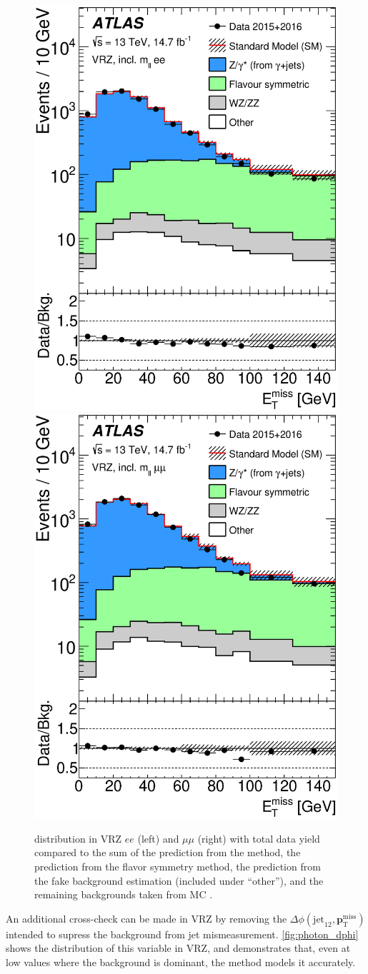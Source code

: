 \begin{centering}
\begin{figure}[!hbt]
\myfloatalign
\includegraphics[width=.45\linewidth]{figures/photons/MET_azmet_ee.eps}
\includegraphics[width=.45\linewidth]{figures/photons/MET_azmet_mm.eps}
\caption{\MET distribution in VRZ $ee$ (left) and $\mu\mu$ (right) with total data yield compared to the sum of the prediction from the \gjets method, the prediction from the flavor symmetry method, the prediction from the fake background estimation (included under ``other''), and the remaining backgrounds taken from \ac{MC} \cite{this_paper}.}
\label{fig:photon_validation}
\end{figure}
\end{centering}

An additional cross-check can be made in VRZ by removing the $\Delta\phi(\text{jet}_{12},{\boldsymbol p}_{\mathrm{T}}^\mathrm{miss})$ intended to supress the \dyjets background from jet mismeasurement. \autoref{fig:photon_dphi} shows the distribution of this variable in VRZ, and demonstrates that, even at low values where the \dyjets background is dominant, the \gjets method models it accurately.

